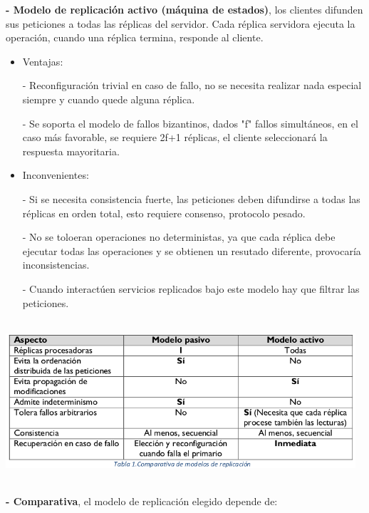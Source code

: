 \documentclass[12pt]{amsart}
\begin{document}
    \textbf{- Modelo de replicación activo (máquina de estados)}, los clientes difunden sus peticiones a todas las réplicas del servidor. Cada réplica servidora ejecuta la operación, cuando una réplica termina, responde al cliente.
    
    \begin{itemize}
        \item Ventajas:
        
        - Reconfiguración trivial en caso de fallo, no se necesita realizar nada especial siempre y cuando quede alguna réplica.
        
        - Se soporta el modelo de fallos bizantinos, dados "f" fallos simultáneos, en el caso más favorable, se requiere 2f+1 réplicas, el cliente seleccionará la respuesta mayoritaria.
        \item Inconvenientes:
        
        - Si se necesita consistencia fuerte, las peticiones deben difundirse a todas las réplicas en orden total, esto requiere consenso, protocolo pesado.
        
        - No se toloeran operaciones no deterministas, ya que cada réplica debe ejecutar todas las operaciones y se obtienen un resutado diferente, provocaría inconsistencias.
        
        - Cuando interactúen servicios replicados bajo este modelo hay que filtrar las peticiones.
        
    \end{itemize}
    
    \begin{center}
    \includegraphics[width=13cm, height=6cm]{comparativa.png}  
    \end{center}
    
    \textbf{- Comparativa}, el modelo de replicación elegido depende de:
    
\end{document}
